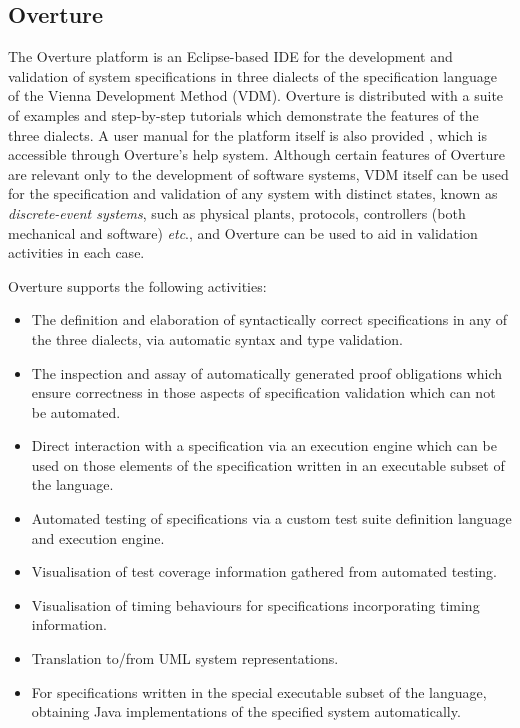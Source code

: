\subsection{Overture}\label{app:overture}
The Overture platform \cite{Larsen&10a} is an Eclipse-based IDE for the development and validation of system specifications in three dialects of the specification language of the Vienna Development Method (VDM).
%
Overture is distributed with a suite of examples and step-by-step tutorials which demonstrate the features of the three dialects.
%
A user manual for the platform itself is also provided \cite{Larsen&13a}, which is accessible through Overture's help system.
%
Although certain features of Overture are relevant only to the development of software systems, VDM itself can be used for the specification and validation of any system with distinct states, known as \emph{discrete-event systems}, such as physical plants, protocols, controllers (both mechanical and software) \emph{etc}.\@, and Overture can be used to aid in validation activities in each case.

Overture supports the following activities:
%
%
%
\begin{itemize}
%
\item  The definition and elaboration of syntactically correct specifications in any of the three dialects, via automatic syntax and type validation.
%
\item  The inspection and assay of automatically generated proof obligations which ensure correctness in those aspects of specification validation which can not be automated.
%
\item  Direct interaction with a specification via an execution engine which can be used on those elements of the specification written in an executable subset of the language.
%
\item  Automated testing of specifications via a custom test suite definition language and execution engine.
%
\item  Visualisation of test coverage information gathered from automated testing.
%
\item  Visualisation of timing behaviours for specifications incorporating timing information.
%
\item  Translation to/from UML system representations.
%
\item  For specifications written in the special executable subset of the language, obtaining Java implementations of the specified system automatically.
%
\end{itemize}
%
%
%

